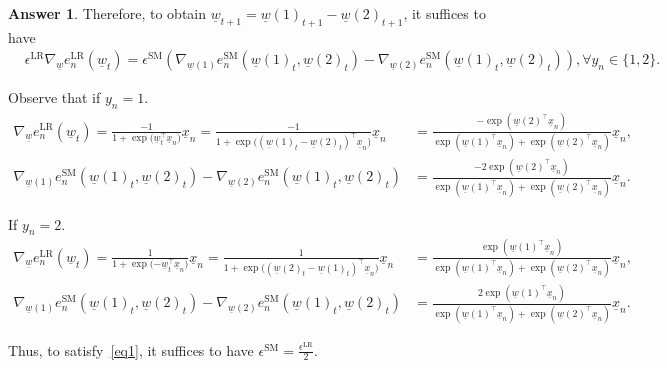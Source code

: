 \documentclass{article}
\theoremstyle{definition}
\newtheorem*{answer}{Answer}
\begin{document}
\begin{question}[start=0]
\begin{question}
\begin{answer}
			
			Therefore, to obtain $\underline{w}_{t+1} = \underline{w}(1)_{t+1} - \underline{w}(2)_{t+1}$, it suffices to have 
			\begin{align}
				&\epsilon^{\text{LR}} \nabla_{\!\underline{w}}e^{\text{LR}}_{n}(\underline{w}_{t}) = \epsilon^{\text{SM}} \left(\nabla_{\!\underline{w}(1)}e^{\text{SM}}_{n}(\underline{w}(1)_{t}, \underline{w}(2)_{t}) -  \nabla_{\!\underline{w}(2)}e^{\text{SM}}_{n}(\underline{w}(1)_{t}, \underline{w}(2)_{t})\right), \forall y_n\in \{1,2\}.\label{eq1}
			\end{align}
			
			Observe that if $y_n=1$.
			\begin{align*}
				 \nabla_{\!\underline{w}}e^{\text{LR}}_{n}(\underline{w}_{t}) = \frac{-1}{1 + \exp{(\underline{w}_{t}^\top \underline{x}_{n}})}\underline{x}_{n}=\frac{-1}{1 + \exp{(\left(\underline{w}(1)_{t} - \underline{w}(2)_{t}\right)^\top \underline{x}_{n}})}\underline{x}_{n} &=\frac{-\exp(\underline{w}(2)^\top\underline{x}_n)}{\exp(\underline{w}(1)^\top\underline{x}_n) + \exp(\underline{w}(2)^\top\underline{x}_n)}\underline{x}_n,\\
				 \nabla_{\!\underline{w}(1)}e^{\text{SM}}_{n}(\underline{w}(1)_{t}, \underline{w}(2)_{t}) -  \nabla_{\!\underline{w}(2)}e^{\text{SM}}_{n}(\underline{w}(1)_{t}, \underline{w}(2)_{t}) &= \frac{-2\exp(\underline{w}(2)^\top\underline{x}_n)}{\exp(\underline{w}(1)^\top\underline{x}_n) + \exp(\underline{w}(2)^\top\underline{x}_n)}\underline{x}_n.
			\end{align*}
			
			If $y_n=2$.
			\begin{align*}
				\nabla_{\!\underline{w}}e^{\text{LR}}_{n}(\underline{w}_{t}) = \frac{1}{1 + \exp{(-\underline{w}_{t}^\top \underline{x}_{n}})}\underline{x}_{n}= \frac{1}{1 + \exp{(\left(\underline{w}(2)_{t} - \underline{w}(1)_{t}\right)^\top \underline{x}_{n}})}\underline{x}_{n} &=\frac{\exp(\underline{w}(1)^\top\underline{x}_n)}{\exp(\underline{w}(1)^\top\underline{x}_n) + \exp(\underline{w}(2)^\top\underline{x}_n)}\underline{x}_n,\\
				\nabla_{\!\underline{w}(1)}e^{\text{SM}}_{n}(\underline{w}(1)_{t}, \underline{w}(2)_{t}) -  \nabla_{\!\underline{w}(2)}e^{\text{SM}}_{n}(\underline{w}(1)_{t}, \underline{w}(2)_{t}) &= \frac{2\exp(\underline{w}(1)^\top\underline{x}_n)}{\exp(\underline{w}(1)^\top\underline{x}_n) + \exp(\underline{w}(2)^\top\underline{x}_n)}\underline{x}_n.
			\end{align*}
			
			Thus, to satisfy~\eqref{eq1}, it suffices to have $\epsilon^{\text{SM}} = \frac{\epsilon^{\text{LR}}}{2}$.
			
		\end{answer}
	\end{question}
\end{question}
\end{document}
